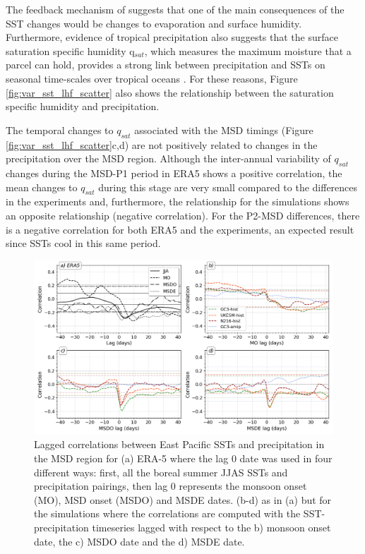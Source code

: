 The feedback mechanism of \cite{magana1999} suggests that one of the main consequences of the SST changes would be changes to evaporation and surface humidity. Furthermore, evidence of tropical precipitation also suggests that the surface saturation specific humidity q$_{sat}$, which measures the maximum moisture that a parcel can hold, provides a strong link between precipitation and SSTs on seasonal time-scales over tropical oceans \citep{yang2019,good2021}. For these reasons, Figure \ref{fig:var_sst_lhf_scatter} also shows the relationship between the saturation specific humidity and precipitation. 

The temporal changes to $q_{sat}$ associated with the MSD timings (Figure \ref{fig:var_sst_lhf_scatter}c,d) are not positively related to changes in the precipitation over the MSD region. Although the inter-annual variability of $q_{sat}$ changes during the MSD-P1  period in ERA5 shows a positive correlation, the mean changes to $q_{sat}$ during this stage are very small compared to the differences in the experiments and, furthermore, the relationship for the simulations shows an opposite relationship (negative correlation). For the P2-MSD differences, there is a negative correlation for both ERA5 and the experiments, an expected result since SSTs cool in this same period.  

\begin{figure}[t!]
\includegraphics[width=\linewidth]{figures/sst_regg.png}
\caption[Lagged correlations of East Pacific SSTs]{Lagged correlations between East Pacific SSTs and precipitation in the MSD region for (a) ERA-5 where the lag 0 date was used in four different ways: first, all the boreal summer JJAS SSTs and precipitation pairings, then lag 0 represents the monsoon onset (MO), MSD onset (MSDO) and MSDE dates. (b-d) as in (a) but for the simulations where the correlations are computed with the SST-precipitation timeseries lagged with respect to the b) monsoon onset date, the c) MSDO date and the d) MSDE date.   }
\label{fig:sst_lag}
\end{figure}

